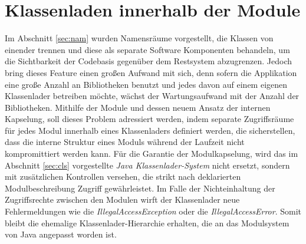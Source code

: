   \section{Klassenladen innerhalb der Module} \label{sec:mod-cll}
    Im Abschnitt \ref{sec:nam} wurden Namensräume vorgestellt, die Klassen von einender trennen und diese als separate Software Komponenten behandeln, um die Sichtbarkeit der Codebasis gegenüber dem Restsystem abzugrenzen. Jedoch bring dieses Feature einen großen Aufwand mit sich, denn sofern die Applikation eine große Anzahl an Bibliotheken benutzt und jedes davon auf einem eigenen Klassenlader betreiben möchte, wächst der Wartungsaufwand mit der Anzahl der Bibliotheken.\newline
    Mithilfe der Module und dessen neuem Ansatz der internen Kapselung, soll dieses Problem adressiert werden, indem separate Zugriffsräume für jedes Modul innerhalb eines Klassenladers definiert werden, die sicherstellen, dass die interne Struktur eines Moduls während der Laufzeit nicht kompromittiert werden kann.\newline
    Für die Garantie der Modulkapselung, wird das im Abschnitt \ref{sec:cls} vorgestellte \textit{Java Klassenlader-System} nicht ersetzt, sondern mit zusätzlichen Kontrollen versehen, die strikt nach deklarierten Modulbeschreibung Zugriff gewährleistet. Im Falle der Nichteinhaltung der Zugriffsrechte zwischen den Modulen wirft der Klassenlader neue Fehlermeldungen wie die \textit{IllegalAccessException} oder die \textit{IllegalAccessError}. Somit bleibt die ehemalige Klassenlader-Hierarchie erhalten, die an das Modulsystem von Java angepasst worden ist. \cite{classLoadingOracle, modulMitJava9}\bigbreak

